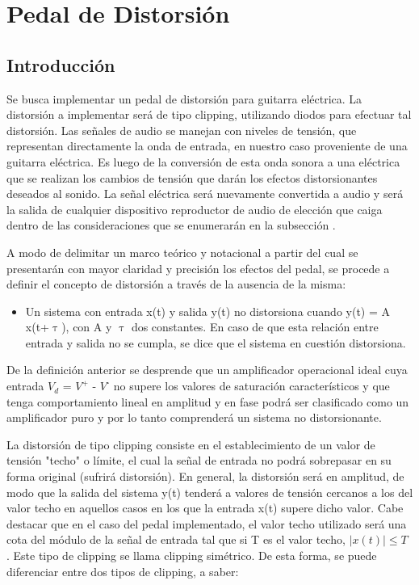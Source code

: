 \documentclass[../../main.tex]{subfiles}
\begin{document}
\section{Pedal de Distorsión}

\subsection{Introducción}

Se busca implementar un pedal de distorsión para guitarra eléctrica. La distorsión a implementar ser\'a de tipo clipping, utilizando diodos para efectuar tal distorsión.
Las señales de audio se manejan con niveles de tensión, que representan directamente la onda de entrada, en nuestro caso proveniente de una guitarra eléctrica. Es luego de la conversión de esta onda sonora a una eléctrica que se realizan los cambios de tensión que darán los efectos distorsionantes deseados al sonido.  La señal eléctrica ser\'a nuevamente convertida a audio y ser\'a la salida de cualquier dispositivo reproductor de audio de elección que caiga dentro de las consideraciones que se enumerarán en la subsección .\par %

A modo de delimitar un marco teórico y notacional a partir del cual se presentarán con mayor claridad y precisión los efectos del pedal, se procede a definir el concepto de distorsión a través de la ausencia de la misma: \par

\begin{itemize}
	\item Un sistema con entrada x(t) y salida y(t) no distorsiona cuando y(t) = A x(t+{$\uptau$}), con A y {$\uptau$} dos constantes.  En caso de que esta relación entre entrada y salida no se cumpla, se dice que el sistema en cuestión distorsiona.\par
\end{itemize}

De la definición anterior se desprende que un amplificador operacional ideal cuya entrada $V_d$ = $V^{\text{+}}$ - $V^{\text{-}}$ no supere los valores de saturación característicos y que tenga comportamiento lineal en amplitud y en fase podrá ser clasificado como un amplificador puro y por lo tanto comprenderá un sistema no distorsionante. \par
La distorsión de tipo clipping consiste en el establecimiento de un valor de tensión "techo" o límite, el cual la señal de entrada no podrá sobrepasar en su forma original (sufrirá distorsión). En general, la distorsión será en amplitud, de modo que la salida del sistema y(t) tenderá a valores de tensión cercanos a los del valor techo en aquellos casos en los que la entrada x(t) supere dicho valor. Cabe destacar que en el caso del pedal implementado, el valor techo utilizado será una cota del módulo de la señal de entrada tal que si T es el valor techo,  $|x(t)|\le T$ . Este tipo de clipping se llama clipping simétrico.
De esta forma,  se puede diferenciar entre dos tipos de clipping, a saber:  \par
\end{document}
